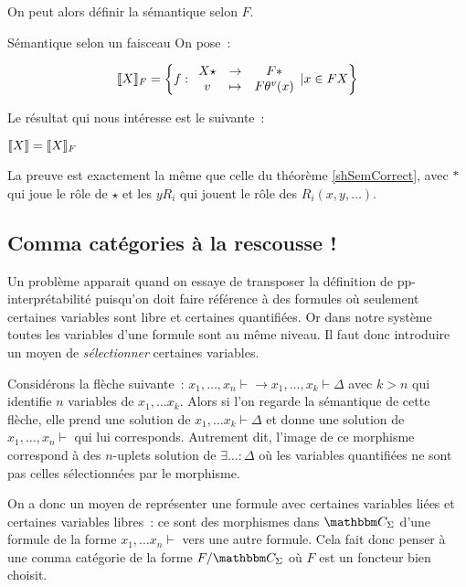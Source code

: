 On peut alors définir la sémantique selon $F$.

\begin{defi}{Sémantique selon un faisceau}
    On pose~:

    \[\llbracket {X} \rrbracket_F = \left\{f:\begin{array}{ccc}
        X\star & \rightarrow & F\ast \\
        v      & \mapsto     & F\theta^v(x)
    \end{array} | x\in F X\right\}\]
\end{defi}

Le résultat qui nous intéresse est le suivante~:

\begin{prop}\label{shSemCorrect2}
    $\llbracket {X} \rrbracket = \llbracket {X} \rrbracket_F$
\end{prop}

\begin{pv}
    La preuve est exactement la même que celle du théorème \ref{shSemCorrect},
    avec $\ast$ qui joue le rôle de $\star$ et les $yR_i$ qui jouent le rôle
    des $R_i(x, y, \dots)$.
\end{pv}

\subsection{Comma catégories à la rescousse !}

Un problème apparait quand on essaye de transposer la définition de pp-interprétabilité
puisqu'on doit faire référence à des formules où seulement certaines variables sont
libre et certaines quantifiées. Or dans notre système toutes les variables d'une
formule sont au même niveau. Il faut donc introduire un moyen de \emph{sélectionner}
certaines variables.

Considérons la flèche suivante~:
$x_1,\dots, x_n\vdash \rightarrow x_1,\dots, x_k\vdash\Delta$ avec $k>n$ qui identifie
$n$ variables de $x_1,\dots x_k$. Alors si l'on regarde la sémantique de cette flèche,
elle prend une solution de $x_1,\dots x_k\vdash\Delta$ et donne une solution de
$x_1,\dots, x_n\vdash$ qui lui corresponds. Autrement dit, l'image de ce morphisme
correspond à des $n$-uplets solution de $\exists \dots:\Delta$ où les variables
quantifiées ne sont pas celles sélectionnées par le morphisme.

On a donc un moyen de représenter une formule avec certaines variables liées et certaines
variables libres~: ce sont des morphismes dans $\C_\Sigma$ d'une formule de la forme
$x_1,\dots x_n\vdash$ vers une autre formule. Cela fait donc penser à une comma
catégorie de la forme $F/\C_\Sigma$ où $F$ est un foncteur bien choisit.

